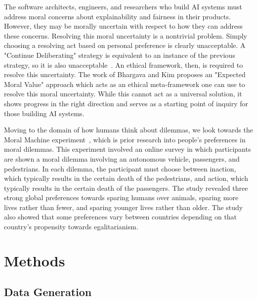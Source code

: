 \documentclass[paper=a4paper]{report}
\begin{document}
The software architects, engineers, and researchers who build AI systems must address moral concerns
about explainability and fairness in their products. However, they may be morally uncertain with
respect to how they can address these concerns. Resolving this moral uncertainty is a nontrivial
problem. Simply choosing a resolving act based on personal preference is clearly unacceptable. A
"Continue Deliberating" strategy is equivalent to an instance of the previous strategy, so it is
also unacceptable~\cite{patrick2017robot}. An ethical framework, then, is required to resolve this
uncertainty. The work of Bhargava and Kim \cite{patrick2017robot} proposes an "Expected Moral Value"
approach which acts as an ethical meta-framework one can use to resolve this moral uncertainty.
While this cannot act as a universal solution, it shows progress in the right direction and serves
as a starting point of inquiry for those building AI systems.

Moving to the domain of how humans think about dilemmas, we look towards the Moral Machine
experiment~\cite{awad2018moral}, which is prior research into people's preferences in moral
dilemmas. This experiment involved an online survey in which participants are shown a moral dilemma
involving an autonomous vehicle, passengers, and pedestrians. In each dilemma, the participant must
choose between inaction, which typically results in the certain death of the pedestrians, and
action, which typically results in the certain death of the passengers. The study revealed three
strong global preferences towards sparing humans over animals, sparing more lives rather than fewer,
and sparing younger lives rather than older. The study also showed that some preferences vary
between countries depending on that country's propensity towards egalitarianism.

\FloatBarrier
\chapter{Methods}

\section{Data Generation}
\end{document}
